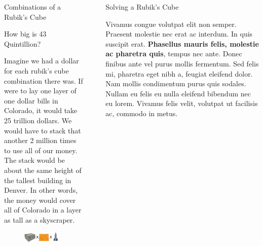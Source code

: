 \documentclass[final]{beamer}
\newlength{\sepwidth}
\newlength{\colwidth}
\newcommand{\separatorcolumn}{\begin{column}{\sepwidth}\end{column}}
\begin{document}
\begin{frame}[t]
\begin{columns}[t]
\begin{column}{\colwidth}
\begin{block}{Combinations of a Rubik's Cube}
  \end{block}

  \begin{block}{How big is 43 Quintillion?}

    \large 
    Imagine we had a dollar for each rubik's cube combination there was. If were to lay one layer of one dollar bills in
    Colorado, it would take 25 trillion dollars. We would have to stack that another 2 million times to use all of our money. \\
    The stack would be about the same height of the tallest building in Denver. In other words,
    the money would cover all of Colorado in a layer as tall as a skyscraper.
    \begin{figure}
      \centering
                    \includegraphics[width=0.9\textwidth]{logos/moneyvisual.png}
    \end{figure}

  \end{block}

\end{column}

\separatorcolumn

\begin{column}{\colwidth}

  \begin{block}{Solving a Rubik's Cube}

    \large Vivamus congue volutpat elit non semper. Praesent molestie nec erat ac
    interdum. In quis suscipit erat. \textbf{Phasellus mauris felis, molestie
    ac pharetra quis}, tempus nec ante. Donec finibus ante vel purus mollis
    fermentum. Sed felis mi, pharetra eget nibh a, feugiat eleifend dolor. Nam
    mollis condimentum purus quis sodales. Nullam eu felis eu nulla eleifend
    bibendum nec eu lorem. Vivamus felis velit, volutpat ut facilisis ac,
    commodo in metus.


\end{block}
\end{column}
\end{columns}
\end{frame}
\end{document}
